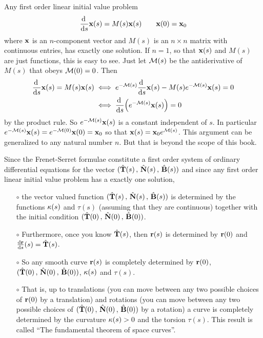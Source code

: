 Any first order linear initial 
value problem
\begin{equation*}
\diff{}{s}\vx(s) = M(s) \vx(s)\qquad
\vx(0)=\vx_0
\end{equation*}
where $\mathbf{x}$ is an $n$-component vector and $M(s)$ is an $n\times n$ matrix with continuous entries, has exactly one solution. If $n=1$, so that 
$\mathbf{x}(s)$ and $M(s)$ are just functions, this is easy to see. Just 
let $\mathcal{M}(s)$ be the antiderivative of $M(s)$ that obeys $\mathcal{M}(0)=0$. Then
\begin{align*}
\diff{}{s}\vx(s) = M(s) \vx(s)
&\iff e^{-\cM(s)}\diff{}{s}\vx(s) - M(s) e^{-\cM(s)} \vx(s)=0 \\
&\iff \diff{}{s}\Big(e^{-\cM(s)}\vx(s)\Big) = 0
\end{align*}
by the product rule. So $e^{-\mathcal{M}(s)}\mathbf{x}(s)$ is a constant independent of $s$. 
In particular $e^{-\mathcal{M}(s)}\mathbf{x}(s)=e^{-\mathcal{M}(0)}\mathbf{x}(0)= \mathbf{x}_0$ so that 
 $\mathbf{x}(s) = \mathbf{x}_0 e^{\mathcal{M}(s)}$.
This argument can be generalized to any natural number $n$. But that is 
beyond the scope of this book.


Since the Frenet-Serret formulae constitute a first order system of ordinary
differential equations for the vector 
$(\hat{\mathbf{T}}(s)\,,\,\hat{\mathbf{N}}(s)\,,\,\hat{\mathbf{B}}(s))$ and since any first order linear 
initial value problem has a exactly one solution,
\begin{itemize}\itemsep1pt \parskip0pt  %
\item[$\circ$] 
the vector valued function $(\hat{\mathbf{T}}(s)\,,\,\hat{\mathbf{N}}(s)\,,\,\hat{\mathbf{B}}(s))$ 
is determined by the functions
$\kappa(s)$ and $\tau(s)$ (assuming that they are continuous) together with 
the initial condition $(\hat{\mathbf{T}}(0)\,,\,\hat{\mathbf{N}}(0)\,,\,\hat{\mathbf{B}}(0))$.
\item[$\circ$] Furthermore, once you know $\hat{\mathbf{T}}(s)$, then
$\mathbf{r}(s)$ is determined by $\mathbf{r}(0)$ and $\diff{\vr}{s}(s)=\hat\vT(s)$.
\item[$\circ$] So any smooth curve $\mathbf{r}(s)$ is completely determined
by $\mathbf{r}(0)$, $(\hat{\mathbf{T}}(0)\,,\,\hat{\mathbf{N}}(0)\,,\,\hat{\mathbf{B}}(0))$, $\kappa(s)$
and $\tau(s)$. 
\item[$\circ$] That is, up to translations (you can move between any two 
possible choices of $\mathbf{r}(0)$ by  a translation) and rotations
(you can move between any two possible choices of 
$(\hat{\mathbf{T}}(0)\,,\,\hat{\mathbf{N}}(0)\,,\,\hat{\mathbf{B}}(0))$ by  a rotation) a curve is       completely determined by the curvature $\kappa(s)>0$ and the torsion 
$\tau(s)$. This result is called ``The fundamental theorem of space curves''.

\end{itemize}


